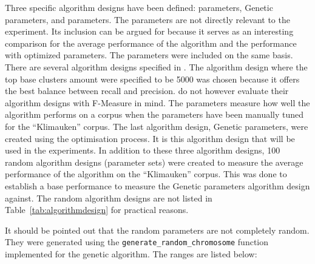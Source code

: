 Three specific algorithm designs have been defined: \citeauthor{Oren1998} parameters, Genetic parameters, and \citeauthor{Moe2014compact} parameters. The \citeauthor{Oren1998} parameters are not directly relevant to the experiment. Its inclusion can be argued for because it serves as an interesting comparison for the average performance of the algorithm and the performance with optimized parameters. The \citeauthor{Moe2014compact} parameters were included on the same basis. There are several algorithm designs specified in \cite{Moe2014compact}. The algorithm design where the top base clusters amount were specified to be 5000 was chosen because it offers the best balance between recall and precision. \citeauthor{Moe2014compact} do not however evaluate their algorithm designs with F-Measure in mind. The \citeauthor{Moe2014compact} parameters measure how well the algorithm performs on a corpus when the parameters have been manually tuned for the ``Klimauken'' corpus. The last algorithm design, Genetic parameters, were created using the \GA optimisation process. It is this algorithm design that will be used in the experiments. In addition to these three algorithm designs, 100 random algorithm designs (parameter sets) were created to measure the average performance of the \CTC algorithm on the ``Klimauken'' corpus. This was done to establish a base performance to measure the Genetic parameters algorithm design against. The random algorithm designs are not listed in Table~\ref{tab:algorithmdesign} for practical reasons.

It should be pointed out that the random parameters are not completely random. They were generated using the \texttt{generate\_random\_chromosome} function implemented for the genetic algorithm. The ranges are listed below:

